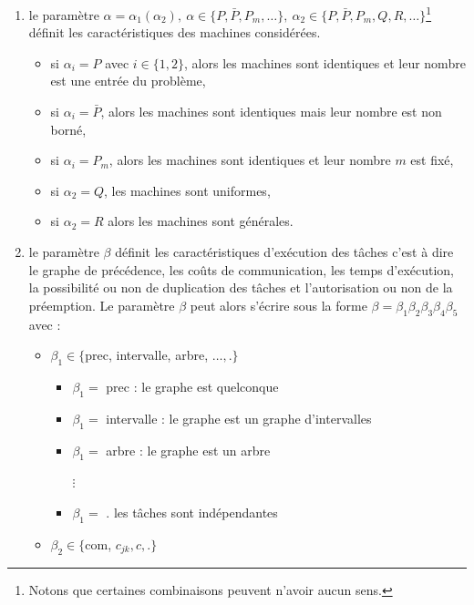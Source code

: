 \documentclass[a4paper,9pt]{report}
\begin{document}
\begin{enumerate}
    \item le paramètre $\alpha = \alpha_1(\alpha_2),\ \alpha \in \{P, \bar{P}, P_m, \dots\} ,\
            \alpha_2 \in \{P, \bar{P}, P_m, Q, R, \dots\}$\footnote{Notons que certaines combinaisons
        peuvent n'avoir aucun sens.} définit les caractéristiques des machines considérées.
        \begin{itemize}
            \item si $\alpha_i = P$ avec $i \in \{1, 2\}$, alors les machines sont identiques et
                leur nombre est une entrée du problème,
            \item si $\alpha_i = \bar{P}$, alors les machines sont identiques mais leur nombre est
                non borné,
            \item si $\alpha_i = P_m$, alors les machines sont identiques et leur nombre $m$ est
                fixé,
            \item si $\alpha_2 = Q$, les machines sont uniformes,
            \item si $\alpha_2 = R$ alors les machines sont générales.
        \end{itemize}
    \item le paramètre $\beta$ définit les caractéristiques d'exécution des tâches c'est à dire le
        graphe de précédence, les coûts de communication, les temps d'exécution, la possibilité ou
        non de duplication des tâches et l'autorisation ou non de la préemption.
        Le paramètre $\beta$ peut alors s'écrire sous la forme $\beta =
        \beta_1\beta_2\beta_3\beta_4\beta_5$ avec :
        \begin{itemize}[label=$\circ$]
            \item $\beta_1 \in \{$prec, intervalle, arbre, $\dots, . \}$
                \begin{itemize}
                    \item $\beta_1 =$ prec : le graphe est quelconque
                    \item $\beta_1 =$ intervalle : le graphe est un graphe d'intervalles
                    \item $\beta_1 =$ arbre : le graphe est un arbre
                    \item[$\vdots$] ~
                    \item $\beta_1 =$ . les tâches sont indépendantes
                \end{itemize}
            \item $\beta_2 \in \{$com, $c_{jk}, c, .\}$

\end{itemize}
\end{enumerate}
\end{document}
